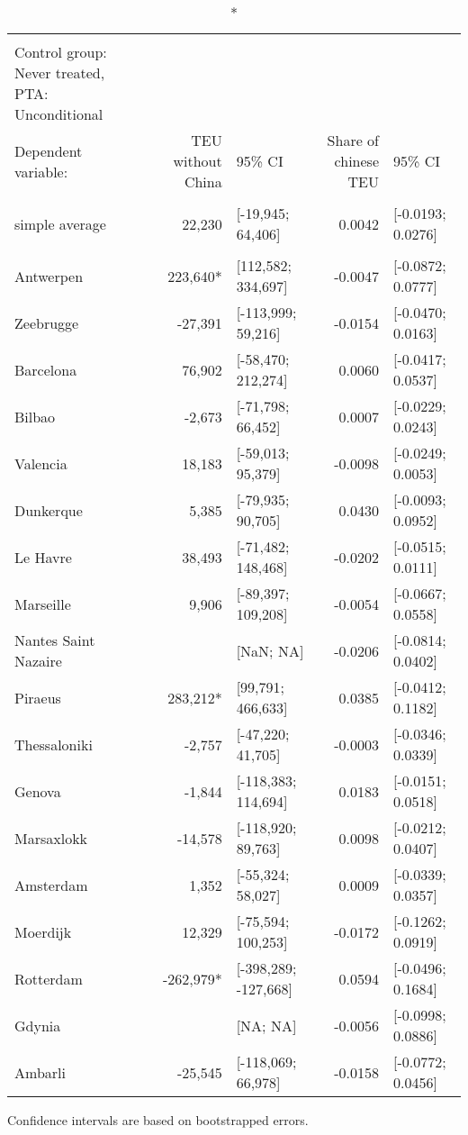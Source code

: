 \setlength{\LTpost}{0mm}
\begin{longtable}{l|rlrl}
\caption*{
{\large Aggregated average treatment effects on container throughput from different origins} \\ 
{\small Control group: Never treated, PTA: Unconditional}
} \\ 
\toprule
\multicolumn{1}{l}{Dependent variable:} & TEU without China & 95\% CI & Share of chinese TEU & 95\% CI \\ 
\midrule\addlinespace[2.5pt]
\multicolumn{5}{l}{\vspace*{-5mm}} \\ 
\midrule\addlinespace[2.5pt]
simple average &   22,230 & [-19,945; 64,406] &  0.0042 & [-0.0193; 0.0276] \\ 
\midrule\addlinespace[2.5pt]
\multicolumn{5}{l}{by group:} \\ 
\midrule\addlinespace[2.5pt]
Antwerpen &  223,640* & [112,582; 334,697] & -0.0047 & [-0.0872; 0.0777] \\ 
Zeebrugge &  -27,391 & [-113,999; 59,216] & -0.0154 & [-0.0470; 0.0163] \\ 
Barcelona &   76,902 & [-58,470; 212,274] &  0.0060 & [-0.0417; 0.0537] \\ 
Bilbao &   -2,673 & [-71,798; 66,452] &  0.0007 & [-0.0229; 0.0243] \\ 
Valencia &   18,183 & [-59,013; 95,379] & -0.0098 & [-0.0249; 0.0053] \\ 
Dunkerque &    5,385 & [-79,935; 90,705] &  0.0430 & [-0.0093; 0.0952] \\ 
Le Havre &   38,493 & [-71,482; 148,468] & -0.0202 & [-0.0515; 0.0111] \\ 
Marseille &    9,906 & [-89,397; 109,208] & -0.0054 & [-0.0667; 0.0558] \\ 
Nantes Saint Nazaire &  & [NaN; NA] & -0.0206 & [-0.0814; 0.0402] \\ 
Piraeus &  283,212* & [99,791; 466,633] &  0.0385 & [-0.0412; 0.1182] \\ 
Thessaloniki &   -2,757 & [-47,220; 41,705] & -0.0003 & [-0.0346; 0.0339] \\ 
Genova &   -1,844 & [-118,383; 114,694] &  0.0183 & [-0.0151; 0.0518] \\ 
Marsaxlokk &  -14,578 & [-118,920; 89,763] &  0.0098 & [-0.0212; 0.0407] \\ 
Amsterdam &    1,352 & [-55,324; 58,027] &  0.0009 & [-0.0339; 0.0357] \\ 
Moerdijk &   12,329 & [-75,594; 100,253] & -0.0172 & [-0.1262; 0.0919] \\ 
Rotterdam & -262,979* & [-398,289; -127,668] &  0.0594 & [-0.0496; 0.1684] \\ 
Gdynia &  & [NA; NA] & -0.0056 & [-0.0998; 0.0886] \\ 
Ambarli &  -25,545 & [-118,069; 66,978] & -0.0158 & [-0.0772; 0.0456] \\ 
\bottomrule
\end{longtable}
\begin{minipage}{\linewidth}
Confidence intervals are based on bootstrapped errors.\\
\end{minipage}

